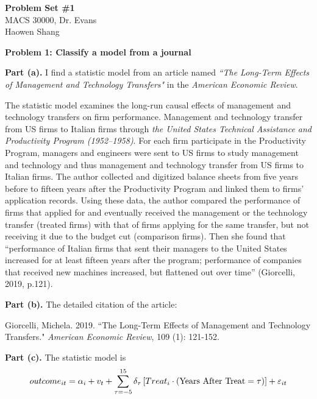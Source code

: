 \documentclass[letterpaper,12pt]{article}
\theoremstyle{definition}
\begin{document}
\begin{flushleft}
  \textbf{\large{Problem Set \#1}} \\
  MACS 30000, Dr. Evans \\
  Haowen Shang
\end{flushleft}

\vspace{5mm}

\noindent\textbf{Problem 1: Classify a model from a journal}

\textbf{Part (a).} I find a statistic model from an article named \emph{``The Long-Term Effects of Management and Technology Transfers"} in the \emph{American Economic Review}.

The statistic model examines the long-run causal effects of management and technology transfers on firm performance. Management and technology transfer from US firms to Italian firms through  \emph{the United States Technical Assistance and Productivity Program (1952–1958)}.  For each firm participate in the Productivity Program, managers and engineers were sent to US firms to study management and technology and thus management and technology transfer from US firms to Italian firms. The author collected and digitized balance sheets from five years before to fifteen years after the Productivity Program and linked them to firms’ application records. Using these data, the author compared the performance of firms that applied for and eventually received the management or the technology transfer (treated firms) with that of firms applying for the same transfer, but not receiving it due to the budget cut (comparison firms). Then she found that ``performance of Italian firms that sent their managers to the United States increased for at least fifteen years after the program; performance of companies that received new machines increased, but flattened out over time'' (Giorcelli, 2019, p.121).

\textbf{Part (b).} The detailed citation of the article:

Giorcelli, Michela. 2019. ``The Long-Term Effects of Management and Technology Transfers." \emph{American Economic Review}, 109 (1): 121-152.

\textbf{Part (c).} The statistic model is 
\begin{equation*}
 outcome_{it} = \alpha_{i} + v_{t} + \sum_{\tau =-5}^{15} \delta_{\tau }\left [ Treat_{i} \cdot \left ( \textup{Years After Treat} = \tau  \right ) \right ] + \varepsilon_{it}
\end{equation*}
\end{document}
